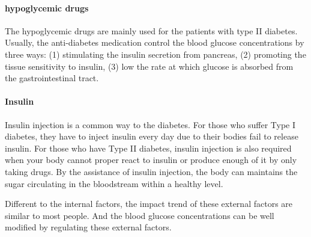\paragraph{hypoglycemic drugs} The hypoglycemic drugs are mainly used for the patients with type II diabetes\cite{bib:eurich2007benefits,bib:jung2006antidiabetic,bib:patel2012overview}. Usually, the anti-diabetes medication control the blood glucose concentrations by three ways: (1) stimulating the insulin secretion from pancreas, (2) promoting the tissue sensitivity to insulin, (3) low the rate at which glucose is absorbed from the gastrointestinal tract.

\paragraph{Insulin} Insulin injection is a common way to the diabetes. For those who suffer Type I diabetes, they have to inject insulin every day due to their bodies fail to release insulin. For those who have Type II diabetes, insulin injection is also required when your body cannot proper react to insulin or produce enough of it by only taking drugs. By the assistance of insulin injection, the body can maintains the sugar circulating in the bloodstream within a healthy level.

Different to the internal factors, the impact trend of these external factors are similar to most people. And the blood glucose concentrations can be well modified by regulating these external factors. 
